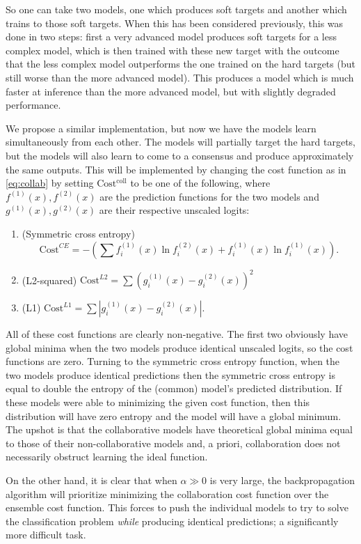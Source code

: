 \documentclass[english,a4paper,oneside]{amsart}
\theoremstyle{definition}
\begin{document}
So one can take two models, one which produces soft targets and another which trains to those soft targets. When this has been considered previously, this was done in two steps: first a very advanced model produces soft targets for a less complex model, which is then trained with these new target with the outcome that the less complex model outperforms the one trained on the hard targets (but still worse than the more advanced model).  This produces a model which is much faster at inference than the more advanced model, but with slightly degraded performance. 

We propose a similar implementation, but now we have the models learn simultaneously from each other. The models will partially target the hard targets, but the models will also learn to come to a consensus and produce approximately the same outputs.  This will be implemented by changing the cost function as in \eqref{eq:collab} by setting $\mathrm{Cost^{coll}}$ to be one of the following, where $f^{(1)}(x), f^{(2)}(x)$ are the prediction functions for the two models and $g^{(1)}(x), g^{(2)}(x)$ are their respective unscaled logits:
\begin{enumerate}
	\item (Symmetric cross entropy) \[\mathrm{Cost}^{CE}=-\left(\sum f^{(1)}_i(x)\ln f^{(2)}_i(x)+f^{(1)}_i(x)\ln f^{(1)}_i(x)\right).\]
	\item (L2-squared) $\mathrm{Cost}^{L2}=\sum (g_i^{(1)}(x)-g_i^{(2)}(x))^2$
	\item (L1) $\mathrm{Cost}^{L1}=\sum |g_i^{(1)}(x)-g_i^{(2)}(x)|.$
\end{enumerate}

All of these cost functions are clearly non-negative. The first two obviously have global minima when the two models produce identical unscaled logits, so the cost functions are zero. Turning to the symmetric cross entropy function, when the two models produce identical predictions then the symmetric cross entropy is equal to double the entropy of the (common) model's predicted distribution. If these models were able to minimizing the given cost function, then this distribution will have zero entropy and the model will have a global minimum. The upshot is that the collaborative models have theoretical global minima equal to those of their  non-collaborative models and, a priori, collaboration does not necessarily obstruct learning the ideal function.

On the other hand, it is clear that when $\alpha \gg 0$ is very large, the backpropagation algorithm will prioritize minimizing the collaboration cost function over the ensemble cost function. This forces to push the individual models to try to solve the classification problem \emph{while} producing identical predictions; a significantly more difficult task.
\end{document}
